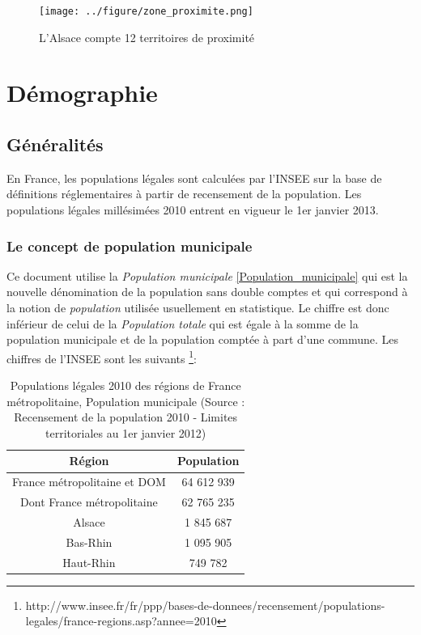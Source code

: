 \documentclass[12pt,english,french,twoside]{report}\usepackage[]{graphicx}\usepackage[]{color}
\providecommand{\tabularnewline}{\\} %
\begin{document}
\begin{figure}[ht]
 \centering
 \texttt{[image: ../figure/zone\_proximite.png]}
 \caption{L'Alsace compte 12 territoires de proximité}
 \label{fig:zp}
\end{figure}

\section{Démographie}
\subsection{Généralités}

En France, les populations légales sont calculées par l'INSEE sur la base de définitions réglementaires à partir de recensement de la population. 
Les populations légales millésimées 2010 entrent en vigueur le 1er janvier 2013.  

\subsubsection{Le concept de population municipale}

Ce document utilise la \emph{Population municipale} \ref{Population_municipale}   qui est la nouvelle dénomination de la population sans double comptes et qui correspond à la notion de \emph{population} utilisée usuellement en statistique.
Le chiffre est donc inférieur de celui de la \emph{Population totale} qui est égale à la somme de la population municipale et de la population comptée à part d'une commune.
Les chiffres de l'INSEE sont les suivants \footnote{http://www.insee.fr/fr/ppp/bases-de-donnees/recensement/populations-legales/france-regions.asp?annee=2010}:

\begin{table}
\begin{center}
\begin{tabular}{|c|c|}
\hline 
Région & Population\tabularnewline
\hline 
\hline 
France métropolitaine et DOM & 64 612 939\tabularnewline
\hline 
Dont France métropolitaine & 62 765 235\tabularnewline
\hline 
Alsace & 1 845 687\tabularnewline
\hline 
Bas-Rhin & 1 095 905\tabularnewline
\hline 
Haut-Rhin & 749 782\tabularnewline
\hline 
\end{tabular}
\caption[Populations légales 2010]{Populations légales 2010 des régions de France métropolitaine, Population
municipale (Source : Recensement de la population 2010 - Limites territoriales
au 1er janvier 2012) }
\label{pop2010}
\end{center}
\end{table}
\end{document}

